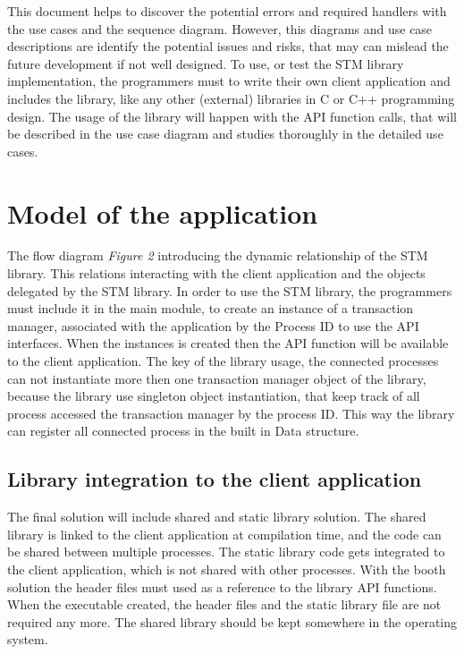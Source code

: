 \documentclass[12pt]{article}
\begin{document}
This document helps to discover the potential errors and required handlers with the use cases and the sequence diagram. However, this diagrams and use case descriptions are identify the potential issues and risks, that may can mislead the future development if not well designed. To use, or test the STM library implementation, the programmers must to write their own client application and includes the library, like any other (external) libraries in C or C++ programming design. The usage of the library will happen with the API function calls, that will be described in the use case diagram and studies thoroughly in the detailed use cases.\\
 
 
\newpage
\section{Model of the application}
The flow diagram \textit{Figure 2} introducing the dynamic relationship of the STM library. This relations interacting with the client application and the objects delegated by the STM library. In order to use the STM library, the programmers must include it in the main module, to create an instance of a transaction manager, associated with the application by the Process ID to use the API interfaces. When the instances is created then the API function will be available to the client application. The key of the library usage, the connected processes can not instantiate more then one transaction manager object of the library, because the library use singleton object instantiation, that keep track of all process accessed the transaction manager by the process ID. This way the library can register all connected process in the built in Data structure.

\subsection{Library integration to the client application}
The final solution will include shared and static library solution. The shared library is linked to the client application at compilation time, and the code can be shared between multiple processes. The static library code gets integrated to the client application, which is not shared with other processes. With the booth solution the header files must used as a reference to the library API functions. When the executable created, the header files and the static library file are not required any more. The shared library should be kept somewhere in the operating system.\\
\end{document}
